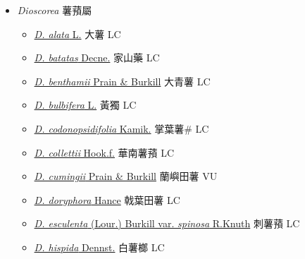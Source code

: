 
  \begin{itemize}
 \item[] \textit{Dioscorea} 薯蕷屬
                    
  \begin{itemize}
        \item[] \href{http://www.theplantlist.org/tpl1.1/search?q=Dioscorea+alata}{\textit{D. alata} L.}   大薯 LC
        \item[] \href{http://www.theplantlist.org/tpl1.1/search?q=Dioscorea+batatas}{\textit{D. batatas} Decne.}   家山藥 LC
        \item[] \href{http://www.theplantlist.org/tpl1.1/search?q=Dioscorea+benthamii}{\textit{D. benthamii} Prain \& Burkill}   大青薯 LC
        \item[] \href{http://www.theplantlist.org/tpl1.1/search?q=Dioscorea+bulbifera}{\textit{D. bulbifera} L.}   黃獨 LC
        \item[] \href{http://www.theplantlist.org/tpl1.1/search?q=Dioscorea+codonopsidifolia}{\textit{D. codonopsidifolia} Kamik.}   掌葉薯\# LC
        \item[] \href{http://www.theplantlist.org/tpl1.1/search?q=Dioscorea+collettii}{\textit{D. collettii} Hook.f.}   華南薯蕷 LC
        \item[] \href{http://www.theplantlist.org/tpl1.1/search?q=Dioscorea+cumingii}{\textit{D. cumingii} Prain \& Burkill}   蘭嶼田薯 VU
        \item[] \href{http://www.theplantlist.org/tpl1.1/search?q=Dioscorea+doryphora}{\textit{D. doryphora} Hance}   戟葉田薯 LC
        \item[] \href{http://www.theplantlist.org/tpl1.1/search?q=Dioscorea+esculenta+var.+spinosa}{\textit{D. esculenta} (Lour.) Burkill var. \textit{spinosa} R.Knuth}   刺薯蕷 LC
        \item[] \href{http://www.theplantlist.org/tpl1.1/search?q=Dioscorea+hispida}{\textit{D. hispida} Dennst.}   白薯榔 LC

\end{itemize}
\end{itemize}
